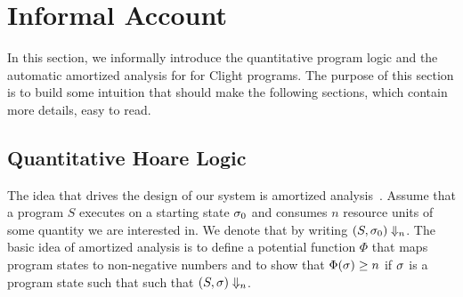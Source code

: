 \documentclass[nocopyrightspace,preprint]{sigplanconf}
\newcommand{\pref}[1]{\prettyref{#1}}
\begin{document}


\section{Informal Account}
\label{sec:inform}

In this section, we informally introduce the quantitative program
logic and the automatic amortized analysis for for Clight programs.
The purpose of this section is to build some intuition that should
make the following sections, which contain more details, easy to read.

\subsection{Quantitative Hoare Logic}

The idea that drives the design of our system is amortized
analysis~\cite{Tarjan-amort}.  Assume that a program $S$
executes on a starting state $\sigma_0$ and consumes $n$ resource units
of some quantity we are interested in.  We denote that by writing $(S,
\sigma_0) \Downarrow_n$.  The basic idea of amortized analysis is to
define a potential function $\Phi$ that maps program states to
non-negative numbers and to show that $\Phi(\sigma) \geq n$ if
$\sigma$ is a program state such that such that $(S, \sigma)
\Downarrow_n$.
\end{document}
